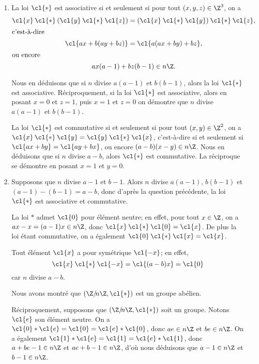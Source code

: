 \begin{enumerate}
\item %
    La loi $\cl{*}$ est associative si et seulement si pour tout $(x,y,z)\in\Z^3$, on a
    \begin{gather*}
        \cl{x}\mathbin{\cl{*}}(\cl{y}\mathbin{\cl{*}}\cl{z}) = (\cl{x}\mathbin{\cl{*}}\cl{y})\mathbin{\cl{*}}\cl{z}, \\
      \intertext{c'est-à-dire}
      \cl{ax+b(ay+bz)} = \cl{a(ax+by)+bz}, \\
      \intertext{ou encore}
      ax(a-1) + bz(b-1) \in n\Z.
    \end{gather*}

    Nous en déduisons que si $n$ divise $a(a - 1)$ et $b(b - 1)$, alors la loi $\cl{*}$ est associative. 
    Réciproquement, si la loi $\cl{*}$ est associative, alors en posant  $x = 0$ et $z = 1$, puis $x = 1$ et $z = 0$ on démontre que $n$ divise $a(a - 1)$ et $b(b - 1)$.

    La loi $\cl{*}$ est commutative si et seulement si pour tout $(x,y)\in\Z^2$, on a $\cl{x}\mathbin{\cl{*}}\cl{y} = \cl{y}\mathbin{\cl{*}}\cl{x}$, c'est-à-dire si et seulement si $\cl{ax + by} = \cl{ay + bx}$, ou encore $(a-b)(x-y)\in n\Z$.
    Nous en déduisons que si $n$ divise $a - b$, alors  $\cl{*}$ est commutative.
    La réciproque se démontre en posant $x = 1$ et $y = 0$.

  \item %
    Supposons que $n$ divise $a - 1$ et $b - 1$.
    Alors $n$ divise $a(a - 1)$, $b(b -1)$ et $(a - 1) - (b - 1) = a - b$, donc d'après la question précédente, la loi $\cl{*}$ est associative et commutative.
    
    La loi $*$ admet $\cl{0}$ pour élément neutre; en effet, pour tout $x\in\Z$, on a $ax - x = (a - 1)x \in n\Z$, donc $\cl{x}\mathbin{\cl{*}}\cl{0} = \cl{x}$.
    De plus la loi étant commutative, on a également $\cl{0}\mathbin{\cl{*}}\cl{x} = \cl{x}$.

    Tout élément $\cl{x}$ a pour symétrique $\cl{-x}$; en effet,
    \[
      \cl{x}\mathbin{\cl{*}}\cl{-x} = \cl{(a - b)x} = \cl{0}
    \]
    car $n$ divise $a - b$.
    
    Nous avons montré que $(\Z/\!n\Z,\cl{*})$ est un groupe abélien.

    Réciproquement, supposons que $(\Z/\!n\Z,\cl{*})$ soit un groupe.
    Notons $\cl{e}$ son élément neutre.
    On a $\cl{0}\mathbin{*}\cl{e} = \cl{0} = \cl{e}\mathbin{*}\cl{0}$, donc $ae\in n\Z$ et $be\in n\Z$.
    On a également $\cl{1}\mathbin{*}\cl{e} = \cl{1} = \cl{e}\mathbin{*}\cl{1}$, donc $a + be - 1\in n\Z$ et $ae + b - 1\in n\Z$, d'où nous déduisons que $a - 1\in n\Z$ et $b - 1\in n\Z$.


\end{enumerate}
